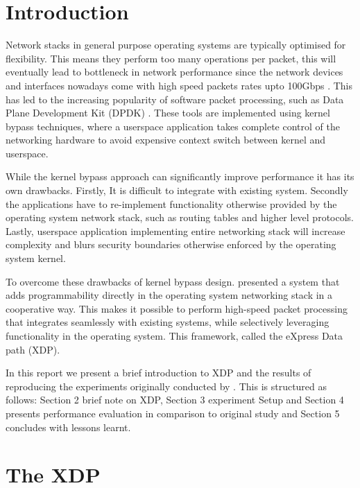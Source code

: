 \documentclass[12pt,titlepage]{article}
\begin{document}


\doublespacing
\tableofcontents
\singlespacing

\newpage

\doublespacing


\section{Introduction}

Network stacks in general purpose operating systems are typically optimised for flexibility. 
This means they perform too many operations per packet, this will eventually lead to bottleneck in network performance  since the network devices and interfaces nowadays come with high speed packets rates upto 100Gbps . This has led to the increasing popularity of software packet processing, such as Data Plane Development Kit (DPDK) \cite{dpdk}. These tools are implemented using kernel bypass techniques, where a userspace application takes complete control of the networking hardware to avoid expensive context switch between kernel and userspace. 

While the kernel bypass approach can significantly improve performance it has its own drawbacks. Firstly, It is difficult to integrate with existing system. Secondly the applications have to re-implement functionality otherwise provided by the operating system network stack, 
such as routing tables and higher level protocols. Lastly, userspace application implementing entire networking stack will increase complexity and blurs security boundaries otherwise enforced by the operating system kernel. 

To overcome these drawbacks of kernel bypass design. \citet{xdp} presented a system that adds programmability directly in the operating system networking stack in a cooperative way. This makes it possible to perform high-speed packet processing that integrates seamlessly with existing systems, while selectively leveraging functionality in the operating system. This framework, called the eXpress Data path (XDP). 

In this report we present a brief introduction to XDP and the results of reproducing the experiments originally conducted by \citet*{xdp}. 
This is structured as follows: Section 2 brief note on XDP, Section 3 experiment Setup and Section 4 presents performance evaluation in comparison to original study and Section 5 concludes with lessons learnt.

\section{The XDP}
\end{document}
